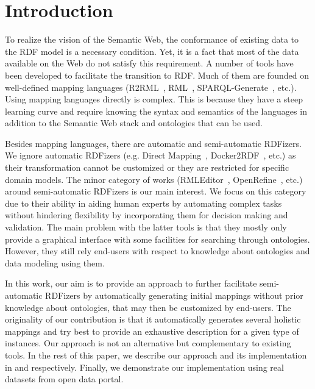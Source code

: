 \section{Introduction}

To realize the vision of the Semantic Web, the conformance of existing data to the RDF model is a necessary condition. Yet, it is a fact that most of the data available on the Web do not satisfy this requirement. A number of tools have been developed to facilitate the transition to RDF. Much of them are founded on well-defined mapping languages (R2RML~\cite{R2RML_W3C:12}, RML~\cite{dimou2014rml}, SPARQL-Generate~\cite{lefranccois2016flexible}, etc.). Using mapping languages directly is complex. This is because they have a steep learning curve and require knowing the syntax and semantics of the languages in addition to the Semantic Web stack and ontologies that can be used. 

Besides mapping languages, there are automatic and semi-automatic RDFizers. We ignore automatic RDFizers (e.g. Direct Mapping~\cite{Direct_Mapping_W3C:12}, Docker2RDF~\cite{ayed2017docker2rdf}, etc.) as their transformation cannot be customized or they are restricted for specific domain models. The minor category of works (RMLEditor~\cite{heyvaert2016rmleditor}, OpenRefine~\cite{verborgh2013using}, etc.) around semi-automatic RDFizers is our main interest. We focus on this category due to their ability in aiding human experts by automating complex tasks without hindering flexibility by incorporating them for decision making and validation. The main problem with the latter tools is that they mostly only provide a graphical interface with some facilities for searching through ontologies. However, they still rely end-users with respect to knowledge about ontologies and data modeling using them.

In this work, our aim is to provide an approach to further facilitate semi-automatic RDFizers by automatically generating initial mappings without prior knowledge about ontologies, that may then be customized by end-users. The originality of our contribution is that it automatically generates several holistic mappings and try best to provide an exhaustive description for a given type of instances. Our approach is not an alternative but complementary to existing tools. In the rest of this paper, we describe our approach and its implementation in  and  respectively. Finally, we demonstrate our implementation using real datasets from open data portal. %



